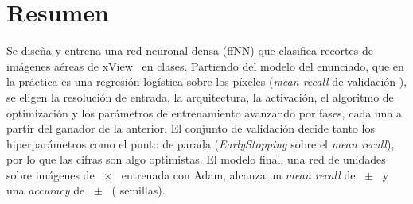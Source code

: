 \section*{Resumen}
Se diseña y entrena una red neuronal densa (ffNN) que clasifica recortes de imágenes aéreas de xView~\cite{xview} en
 clases. Partiendo del modelo del enunciado, que en la práctica es una regresión logística sobre los
píxeles (\emph{mean recall} de validación ), se eligen la resolución de entrada, la
arquitectura, la activación, el algoritmo de optimización y los parámetros de entrenamiento avanzando por fases, cada
una a partir del ganador de la anterior. El conjunto de validación decide tanto los hiperparámetros como el punto de
parada (\emph{EarlyStopping} sobre el \emph{mean recall}), por lo que las cifras son algo optimistas. El modelo final,
una red de  unidades sobre imágenes de ~$\times$~ entrenada con Adam,
alcanza un \emph{mean recall} de ~$\pm$~ y una \emph{accuracy} de
~$\pm$~ ( semillas).